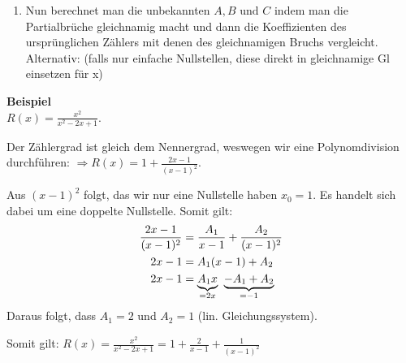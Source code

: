 \begin{enumerate}[leftmargin=*]
\begin{enumerate}[leftmargin=0.3cm]
		
	\end{enumerate}
	\item Nun berechnet man die unbekannten $A, B \text{ und } C$ indem man die Partialbrüche
	gleichnamig macht und dann die Koeffizienten des ursprünglichen Zählers mit
	denen des gleichnamigen Bruchs vergleicht. Alternativ: (falls nur einfache Nullstellen, diese 
	direkt in gleichnamige Gl einsetzen für x)
\end{enumerate}

\textbf{Beispiel}\\
$R(x) = \frac{x^2}{x^2-2x+1}$.

Der Zählergrad ist gleich dem Nennergrad,
weswegen wir eine Polynomdivision durchführen: $\Rightarrow R(x) = 1 +
\frac{2x-1}{(x-1)^2}$.

Aus $(x-1)^2$ folgt, das wir nur eine Nullstelle haben $x_0 = 1$. Es handelt
sich dabei um eine doppelte Nullstelle. Somit gilt:
\begin{align*}
\frac{2x-1}{(x-1)^2} &= \frac{A_1}{x-1} + \frac{A_2}{(x-1)^2}\\
2x-1 &= A_1(x-1) + A_2\\
2x-1 &= \underset{= 2x}{\underbrace{A_1 x}} \;\; \underset{= -1 }{\underbrace{- A_1 + A_2}}
\end{align*}
Daraus folgt, dass $A_1 = 2$ und $A_2 = 1$ (lin. Gleichungssystem).

Somit gilt: $R(x) = \frac{x^2}{x^2-2x+1} = 1 + \frac{2}{x-1} +
\frac{1}{(x-1)^2}$
